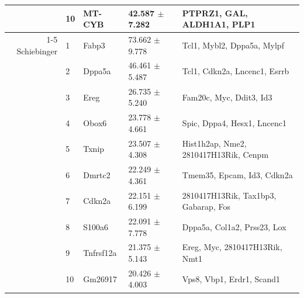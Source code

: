 \begin{table}[ht]
\begin{tabularx}{\textwidth}{r l l l X}
 & 10 & MT-CYB & 42.587 $\pm$ 7.282 & PTPRZ1, GAL, ALDH1A1, PLP1 \\
\cmidrule{1-5}
Schiebinger & 1 & Fabp3 & 73.662 $\pm$ 9.778 & Tcl1, Mybl2, Dppa5a, Mylpf \\
 & 2 & Dppa5a & 46.461 $\pm$ 5.487 & Tcl1, Cdkn2a, Lncenc1, Esrrb \\
 & 3 & Ereg & 26.735 $\pm$ 5.240 & Fam20c, Myc, Ddit3, Id3 \\
 & 4 & Obox6 & 23.778 $\pm$ 4.661 & Spic, Dppa4, Hesx1, Lncenc1 \\
 & 5 & Txnip & 23.507 $\pm$ 4.308 & Hist1h2ap, Nme2, 2810417H13Rik, Cenpm \\
 & 6 & Dmrtc2 & 22.249 $\pm$ 4.361 & Tmem35, Epcam, Id3, Cdkn2a \\
 & 7 & Cdkn2a & 22.151 $\pm$ 6.199 & 2810417H13Rik, Tax1bp3, Gabarap, Fos \\
 & 8 & S100a6 & 22.091 $\pm$ 7.778 & Dppa5a, Col1a2, Prss23, Lox \\
 & 9 & Tnfrsf12a & 21.375 $\pm$ 5.143 & Ereg, Myc, 2810417H13Rik, Nmt1 \\
 & 10 & Gm26917 & 20.426 $\pm$ 4.003 & Vps8, Vbp1, Erdr1, Scand1 \\
\bottomrule
\end{tabularx}
\end{table}